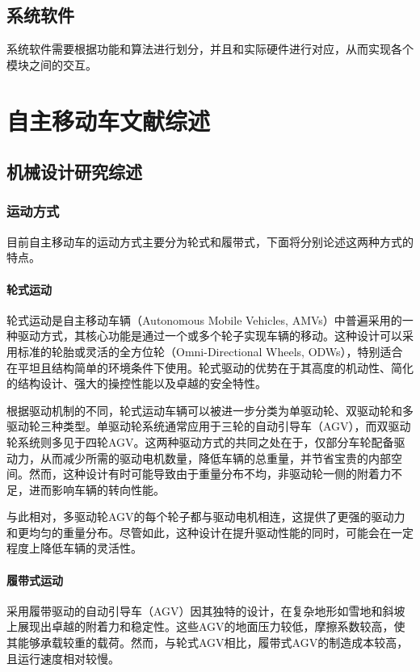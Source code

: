 \documentclass{report}
\begin{document}
\section{系统软件}
\label{sec:label}
系统软件需要根据功能和算法进行划分，并且和实际硬件进行对应，从而实现各个模块之间的交互。


\chapter{自主移动车文献综述}
\label{sec:label}


\section{机械设计研究综述}
\subsection{运动方式}
\label{subsec:label}
目前自主移动车的运动方式主要分为轮式和履带式，下面将分别论述这两种方式的特点。
\subsubsection{轮式运动}
\label{subsec:label}
轮式运动是自主移动车辆（Autonomous Mobile Vehicles, AMVs）中普遍采用的一种驱动方式，其核心功能是通过一个或多个轮子实现车辆的移动。这种设计可以采用标准的轮胎或灵活的全方位轮（Omni-Directional Wheels, ODWs），特别适合在平坦且结构简单的环境条件下使用。轮式驱动的优势在于其高度的机动性、简化的结构设计、强大的操控性能以及卓越的安全特性。

根据驱动机制的不同，轮式运动车辆可以被进一步分类为单驱动轮、双驱动轮和多驱动轮三种类型。单驱动轮系统通常应用于三轮的自动引导车（AGV），而双驱动轮系统则多见于四轮AGV。这两种驱动方式的共同之处在于，仅部分车轮配备驱动力，从而减少所需的驱动电机数量，降低车辆的总重量，并节省宝贵的内部空间。然而，这种设计有时可能导致由于重量分布不均，非驱动轮一侧的附着力不足，进而影响车辆的转向性能。

与此相对，多驱动轮AGV的每个轮子都与驱动电机相连，这提供了更强的驱动力和更均匀的重量分布。尽管如此，这种设计在提升驱动性能的同时，可能会在一定程度上降低车辆的灵活性。

\subsubsection{履带式运动}
\label{subsec:label}
采用履带驱动的自动引导车（AGV）因其独特的设计，在复杂地形如雪地和斜坡上展现出卓越的附着力和稳定性。这些AGV的地面压力较低，摩擦系数较高，使其能够承载较重的载荷。然而，与轮式AGV相比，履带式AGV的制造成本较高，且运行速度相对较慢。
\end{document}
